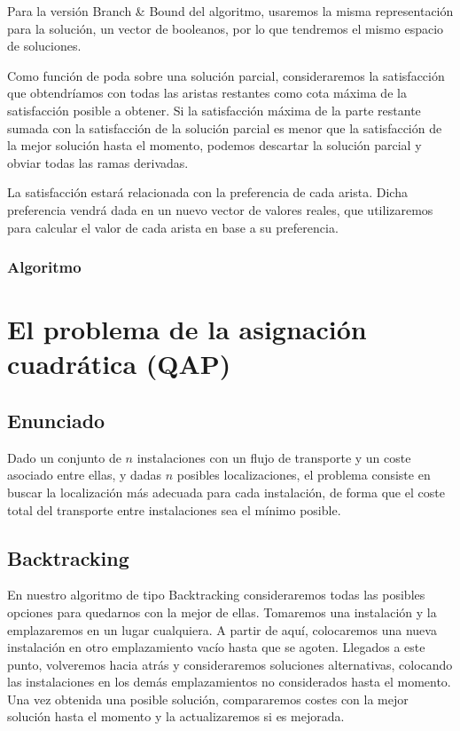\documentclass[a4paper, 11pt]{article} %
\begin{document}
    Para la versión Branch \& Bound del algoritmo, usaremos la misma representación para la solución, un vector de booleanos, por lo que tendremos el mismo espacio de soluciones.
    
    Como función de poda sobre una solución parcial, consideraremos la satisfacción que obtendríamos con todas las aristas restantes como cota máxima de la satisfacción posible a obtener. Si la satisfacción máxima de la parte restante sumada con la satisfacción de la solución parcial es menor que la satisfacción de la mejor solución hasta el momento, podemos descartar la solución parcial y obviar todas las ramas derivadas. 
    
    La satisfacción estará relacionada con la preferencia de cada arista. Dicha preferencia vendrá dada en un nuevo vector de valores reales, que utilizaremos para calcular el valor de cada arista en base a su preferencia. 
    
    \subsubsection{Algoritmo}    
    \small
	\texttt{}
    \normalsize

\section{El problema de la asignación cuadrática (QAP)}
  \subsection{Enunciado}
    Dado un conjunto de $n$ instalaciones con un flujo de transporte y un coste asociado entre ellas, y dadas $n$ posibles 
    localizaciones, el problema consiste en buscar la localización más adecuada para cada instalación, de forma que el 
    coste total del transporte entre instalaciones sea el mínimo posible. 

  \subsection{Backtracking}
  
  En nuestro algoritmo de tipo Backtracking consideraremos todas las posibles opciones para quedarnos con la mejor de ellas. Tomaremos una instalación y la emplazaremos en un lugar cualquiera. A partir de aquí, colocaremos una nueva instalación en otro emplazamiento vacío hasta que se agoten. Llegados a este punto, volveremos hacia atrás y consideraremos soluciones alternativas, colocando las instalaciones en los demás emplazamientos no considerados hasta el momento. Una vez obtenida una posible solución, compararemos costes con la mejor solución hasta el momento y la actualizaremos si es mejorada. 
  
\end{document}
